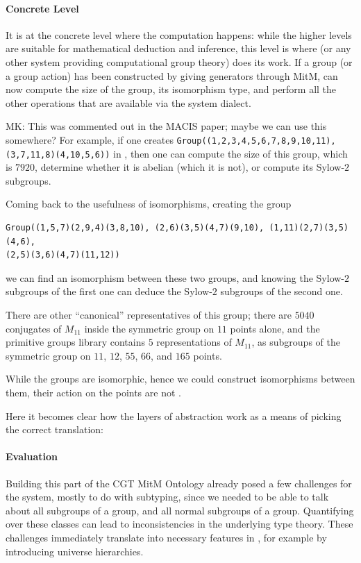 \paragraph{Concrete Level}

It is at the concrete level where the computation happens: while the higher levels
are suitable for mathematical deduction and inference, this level is where \GAP
(or any other system providing computational group theory) does its work.
If a group (or a group action) has been constructed by giving generators
through MitM, \GAP can now compute the size of the group, its isomorphism type,
and perform all the other operations that are available via the \GAP system
dialect.

\begin{oldpart}{MK: This was commented out in the MACIS paper; maybe we can use this somewhere?}
For example, if one creates \lstinline|Group((1,2,3,4,5,6,7,8,9,10,11),(3,7,11,8)(4,10,5,6))|
in \GAP, then one can compute the size of this group, which is $7920$, determine
whether it is abelian (which it is not), or compute its Sylow-$2$ subgroups.

Coming back to the usefulness of isomorphisms, creating the group
\begin{lstlisting}
Group((1,5,7)(2,9,4)(3,8,10), (2,6)(3,5)(4,7)(9,10), (1,11)(2,7)(3,5)(4,6),
(2,5)(3,6)(4,7)(11,12))
\end{lstlisting}
we can find an isomorphism between these two groups, and knowing the Sylow-$2$
subgroups of the first one can deduce the Sylow-$2$ subgroups of the second one.

There are other ``canonical'' representatives of this group; there are $5040$ conjugates
of $M_{11}$ inside the symmetric group on $11$ points alone, and the \GAP primitive groups
library contains $5$ representations of $M_{11}$, as subgroups of the symmetric group on
$11$, $12$, $55$, $66$, and $165$ points.

While the groups are isomorphic, hence we could construct isomorphisms between
them, their action on the points are not .

Here it becomes clear how the layers of abstraction work as a means of picking the correct
translation:

\paragraph{Evaluation}
Building this part of the CGT MitM Ontology already posed a few challenges for the \MMT
system, mostly to do with subtyping, since we needed to be able to talk about all
subgroups of a group, and all normal subgroups of a group. Quantifying over these classes
can lead to inconsistencies in the underlying type theory.  These challenges immediately
translate into necessary features in \OMMT, for example by introducing universe
hierarchies.  
\end{oldpart}

